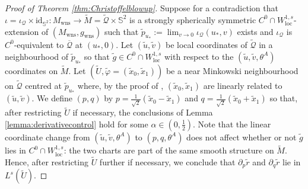 \documentclass{article}
\newcommand{\Q}{\mathcal{Q}}
\newcommand{\loc}{\mathrm{loc}}
\newcommand{\Sp}{\mathbb{S}}
\newcommand{\id}{\mathrm{id}}
\newcommand{\Mw}{M_{\mathrm{wns}}}
\newcommand{\gw}{g_{\mathrm{wns}}}
\begin{document}
\begin{proof}[Proof of Theorem \ref{thm:Christoffelblowup}] 
Suppose for a contradiction that $\iota=\iota_\Q\times\id_{\Sp^2}:\Mw\to\tilde{M}=\tilde{\Q}\times\Sp^2$ is a strongly spherically symmetric $C^0 \cap W^{1,s}_{\loc}$-extension of $(\Mw,\gw)$ 
such that $\tilde{p}_{u_*}:=\lim_{v\to0}\iota_\Q(u_*,v)$ exists and $\iota_\Q$ is $C^0$-equivalent to $\overline{\Q}$ at $(u_*,0)$.
Let $(\tilde{u},\tilde{v})$ be local coordinates of $\tilde{\Q}$ in a neighbourhood of $\tilde{p}_{u_*}$ so that $\tilde{g} \in C^0 \cap W^{1,s}_{\loc}$ with respect to the $(\tilde{u}, \tilde{v}, \theta^A)$ coordinates on $\tilde{M}$.
Let $(\tilde{U},\tilde{\varphi}=(\tilde{x}_0,\tilde{x}_1))$ be a near Minkowski neighbourhood on $\tilde{\Q}$ centred at $\tilde{p}_{u_*}$ where, by the proof of \cite[Lemma 2.4]{SbierskiSchw}, $(\tilde{x}_0,\tilde{x}_1)$ are linearly related to $(\tilde{u},\tilde{v})$. We define $(p,q)$ by $p=\frac{1}{\sqrt{2}}(\tilde{x}_0-\tilde{x}_1)$ and $  q=\frac{1}{\sqrt{2}}(\tilde{x}_0+\tilde{x}_1)$ so that, after restricting $\tilde{U}$ if necessary, the 
conclusions of Lemma \ref{lemma:derivativecontrol} hold for some $\alpha\in\left(0,\frac{1}{2}\right)$. Note that the linear coordinate change from $(\tilde{u},\tilde{v},\theta^A)$ to $(p,q,\theta^A)$ does not affect whether or not 
$\tilde{g}$ lies in $C^0 \cap W^{1,s}_{\loc}$: the two charts are part of the same smooth structure on $\tilde{M}$. Hence, after restricting $\tilde{U}$ further if necessary, we conclude that $\partial_p\tilde{r}$ and $\partial_q\tilde{r}$ lie in $L^s(\tilde{U})$.

\end{proof}
\end{document}
